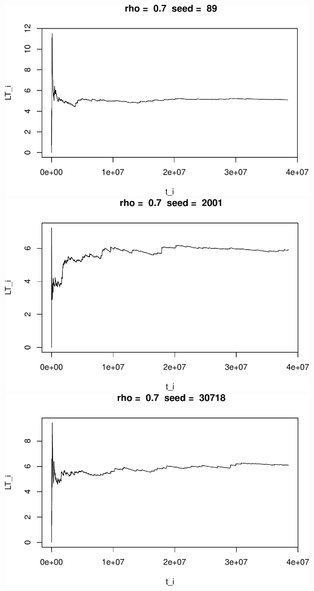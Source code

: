\documentclass[]{article}
\begin{document}
\includegraphics{003_files/figure-latex/unnamed-chunk-18-7.pdf}
\includegraphics{003_files/figure-latex/unnamed-chunk-18-8.pdf}
\includegraphics{003_files/figure-latex/unnamed-chunk-18-9.pdf}
\end{document}
